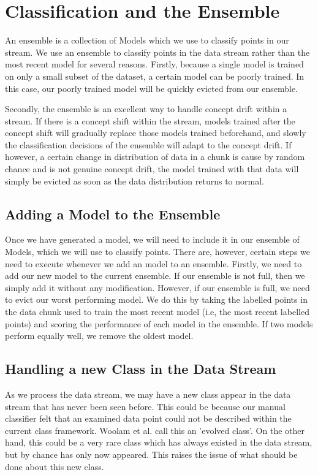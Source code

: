 \documentclass[12pt,a4paper,oneside]{report}
\begin{document}
\section*{Classification and the Ensemble}
 
An ensemble is a collection of Models which we use to classify points in our stream. We use an ensemble to classify points in the data stream rather than the most recent model for several reasons. Firstly, because a single model is trained on only a small subset of the dataset, a certain model can be poorly trained. In this case, our poorly trained model will be quickly evicted from our ensemble. 

Secondly, the ensemble is an excellent way to handle concept drift within a stream. If there is a concept shift within the stream, models trained after the concept shift will gradually replace those models trained beforehand, and slowly the classification decisions of the ensemble will adapt to the concept drift. If however, a certain change in distribution of data in a chunk is cause by random chance and is not genuine concept drift, the model trained with that data will simply be evicted as soon as the data distribution returns to normal. 

\subsection*{Adding a Model to the Ensemble}

Once we have generated a model, we will need to include it in our ensemble of Models, which we will use to classify points. There are, however, certain steps we need to execute whenever we add an model to an ensemble. Firstly, we need to add our new model to the current ensemble. If our ensemble is not full, then we simply add it without any modification. However, if our ensemble is full, we need to evict our worst performing model. We do this by taking the labelled points in the data chunk used to train the most recent model (i.e, the most recent labelled points) and scoring the performance of each model in the ensemble. If two models perform equally well, we remove the oldest model.

\subsection*{Handling a new Class in the Data Stream}

As we process the data stream, we may have a new class appear in the data stream that has never been seen before. This could be because our manual classifier felt that an examined data point could not be described within the current class framework. Woolam et al.\cite{LabStr} call this an 'evolved class'. On the other hand, this could be a very rare class which has always existed in the data stream, but by chance has only now appeared. This raises the issue of what should be done about this new class. 
\end{document}
